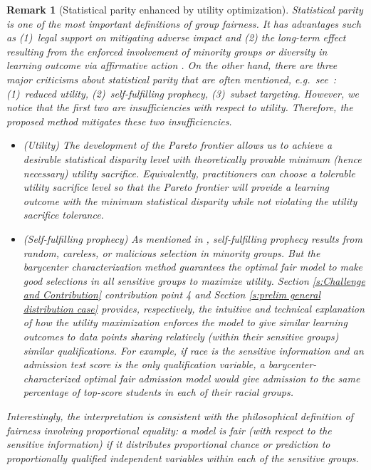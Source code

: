 \documentclass[twoside,11pt]{article}
\newtheorem{rema}{Remark}[section]{\bfseries}{\itshape}
\begin{document}
\begin{rema}[Statistical parity enhanced by utility optimization]\label{remark1}
Statistical parity is one of the most important definitions of group fairness. It has advantages such as (1)~legal support on mitigating adverse impact and (2) the long-term effect resulting from the enforced involvement of minority groups or diversity in learning outcome via affirmative action \cite{hu2018short}. On the other hand, there are three major criticisms about statistical parity that are often mentioned, e.g.\ see~\cite{dwork2012fairness,hardt2016equality}: (1)~reduced utility, (2)~self-fulfilling prophecy, (3)~subset targeting. However, we notice that the first two are insufficiencies with respect to utility. Therefore, the proposed method mitigates these two insufficiencies.
\begin{itemize}
\item[1] (Utility) The development of the Pareto frontier allows us to achieve a desirable statistical disparity level with theoretically provable minimum (hence necessary) utility sacrifice. Equivalently, practitioners can choose a tolerable utility sacrifice level so that the Pareto frontier will provide a learning outcome with the minimum statistical disparity while not violating the utility sacrifice tolerance.
\item[2] (Self-fulfilling prophecy) As mentioned in \cite{dwork2012fairness,hardt2016equality}, self-fulfilling prophecy results from random, careless, or malicious selection in minority groups. But the barycenter characterization method guarantees the optimal fair model to make good selections in all sensitive groups to maximize utility. Section \ref{s:Challenge and Contribution} contribution point 4 and Section \ref{s:prelim general distribution case} provides, respectively, the intuitive and technical explanation of how the utility maximization enforces the model to give similar learning outcomes to data points sharing relatively (within their sensitive groups) similar qualifications. For example, if race is the sensitive information and an admission test score is the only qualification variable, a barycenter-characterized optimal fair admission model would give admission to the same percentage of top-score students in each of their racial groups.
\end{itemize}
Interestingly, the interpretation is consistent with the philosophical definition of fairness involving proportional equality: a model is fair (with respect to the sensitive information) if it distributes proportional chance or prediction to proportionally qualified independent variables within each of the sensitive groups. 
\end{rema}
\end{document}
